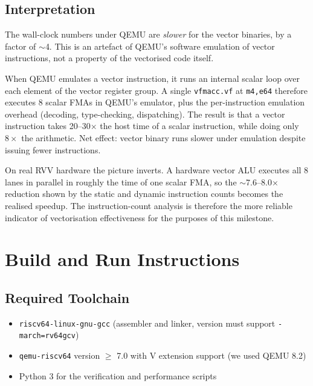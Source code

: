 \documentclass[11pt,a4paper]{article}
\begin{document}
\subsection{Interpretation}

The wall-clock numbers under QEMU are \emph{slower} for the vector
binaries, by a factor of $\sim$4. This is an artefact of QEMU's
software emulation of vector instructions, not a property of the
vectorised code itself.

When QEMU emulates a vector instruction, it runs an internal scalar loop
over each element of the vector register group. A single \texttt{vfmacc.vf}
at \texttt{m4,e64} therefore executes 8 scalar FMAs in QEMU's emulator,
plus the per-instruction emulation overhead (decoding, type-checking,
dispatching). The result is that a vector instruction takes 20--30$\times$
the host time of a scalar instruction, while doing only $8\times$ the
arithmetic. Net effect: vector binary runs slower under emulation despite
issuing fewer instructions.

On real RVV hardware the picture inverts. A hardware vector ALU executes
all 8 lanes in parallel in roughly the time of one scalar FMA, so the
$\sim$7.6--8.0$\times$ reduction shown by the static and dynamic
instruction counts becomes the realised speedup. The instruction-count
analysis is therefore the more reliable indicator of vectorisation
effectiveness for the purposes of this milestone.

\section{Build and Run Instructions}

\subsection{Required Toolchain}

\begin{itemize}
    \item \texttt{riscv64-linux-gnu-gcc} (assembler and linker, version
          must support \texttt{-march=rv64gcv})
    \item \texttt{qemu-riscv64} version $\geq$ 7.0 with V extension
          support (we used QEMU 8.2)
    \item Python 3 for the verification and performance scripts
\end{itemize}
\end{document}
